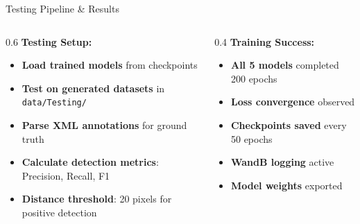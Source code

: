 \begin{frame}{Testing Pipeline \& Results}
\begin{columns}
\begin{column}{0.6\textwidth}
\textbf{Testing Setup:}
\begin{itemize}
    \item \textbf{Load trained models} from checkpoints
    \item \textbf{Test on generated datasets} in \texttt{data/Testing/}
    \item \textbf{Parse XML annotations} for ground truth
    \item \textbf{Calculate detection metrics}: Precision, Recall, F1
    \item \textbf{Distance threshold}: 20 pixels for positive detection
\end{itemize}
\end{column}
\begin{column}{0.4\textwidth}
\textbf{Training Success:}
\begin{itemize}
    \item \textbf{All 5 models} completed 200 epochs
    \item \textbf{Loss convergence} observed
    \item \textbf{Checkpoints saved} every 50 epochs
    \item \textbf{WandB logging} active
    \item \textbf{Model weights} exported
\end{itemize}
\end{column}
\end{columns}
\end{frame}